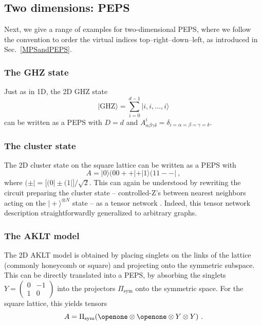 \documentclass[rmp,aps,reprint,superscriptaddress,nobalancelastpage]{revtex4-1}
\newcommand{\ket}[1]{\vert#1\rangle}
\let\endignorethis\relax
\def\TOCstop{\addtocontents{toc}{\ignorethis}}
\def\TOCstart{\addtocontents{toc}{\endignorethis}}
\begin{document}
    \TOCstart
    \subsection{Two dimensions: PEPS}
    \TOCstop

    Next, we give a range of examples for two-dimensional PEPS, where we follow the convention to order the virtual indices top--right--down--left, as introduced in Sec.~\ref{MPSandPEPS}.

    \subsubsection{The GHZ state\label{sec:examples:2D:GHZ}} Just as in 1D, the 2D GHZ state
    \[
        \ket{\mathrm{GHZ}}=\sum_{i=0}^{d-1}\ket{i,i,\dots,i}
    \]
    can be written as a PEPS with $D=d$ and $A^i_{\alpha\beta\gamma\delta}=\delta_{i=\alpha=\beta=\gamma=\delta}$.


    \subsubsection{The cluster state} The 2D cluster state \cite{raussendorf:cluster-short} on the square lattice can be written as a PEPS with
    \[
        A=\ket0(00++|+\ket{1}(11--|\ ,
    \]
    where $(\pm|=\big[(0|\pm(1|\big]/\sqrt{2}$.
    This can again be understood by rewriting the circuit preparing the cluster state -- controlled-Z's between nearest neighbors acting on the $\ket{+}^{\otimes N}$ state -- as a tensor network \cite{verstraete:mbc-peps}. Indeed, this tensor network description straightforwardly generalized to arbitrary graphs.



    \subsubsection{The AKLT model}
    The 2D AKLT model \cite*{affleck:aklt-cmp} is obtained by placing singlets on the links of the lattice (commonly honeycomb or square) and projecting onto the symmetric subspace. This can be directly translated into a PEPS, by absorbing the singlets $Y=\left(\begin{smallmatrix}0&-1\\1&0\end{smallmatrix}\right)$ into the projectors $\Pi_\mathrm{sym}$ onto the symmetric space. For the square lattice, this yields tensors
    \[
        A= \Pi_\mathrm{sym}(\openone\otimes\openone\otimes Y\otimes Y)\ .
    \]
\end{document}
